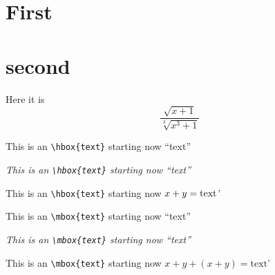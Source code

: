 \documentclass{article}
\begin{document}
\section{First}\section{second}Here it is
$$
\displaystyle\frac{\sqrt{x+1}} {\sqrt[3]{x^3+1}}
$$

This is an \verb#\hbox{text}# starting now ``\hbox{text}''

{\it This is an \verb#\hbox{text}# starting now ``\hbox{text}'' }

This is an \verb#\hbox{text}# starting now $x+y = \hbox{text}$'

This is an \verb#\mbox{text}# starting now ``\mbox{text}''

{\it This is an \verb#\mbox{text}# starting now ``\mbox{text}'' }

This is an \verb#\mbox{text}# starting now $x+y + (x+y) = \mbox{text}$'
\end{document}
